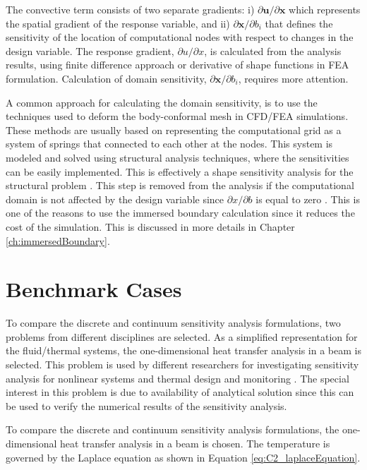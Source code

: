 The convective term consists of two separate gradients: i) $\partial \mathbf{u} / \partial \mathbf{x}$ which represents the spatial gradient of the response variable, and ii) $\partial \mathbf{x} / \partial b_i$ that defines the sensitivity of the location of computational nodes with respect to changes in the design variable. The response gradient, $\partial u/\partial x$, is calculated from the analysis results, using finite difference approach or derivative of shape functions in FEA formulation. Calculation of domain sensitivity, $\partial \mathbf{x} / \partial b_i$, requires more attention.

A common approach for calculating the domain sensitivity, is to use the techniques used to deform the body-conformal mesh in CFD/FEA simulations. These methods are usually based on representing the computational grid as a system of springs that connected to each other at the nodes. This system is modeled and solved using structural analysis techniques, where the sensitivities can be easily implemented. This is effectively a shape sensitivity analysis for the structural problem \cite{haftka1986structural}. This step is removed from the analysis if the computational domain is not affected by the design variable since $\partial x/\partial b$ is equal to zero \cite{gobal2014continuum}. This is one of the reasons to use the immersed boundary calculation since it reduces the cost of the simulation. This is discussed in more details in Chapter \ref{ch:immersedBoundary}.

\section{Benchmark Cases}
To compare the discrete and continuum sensitivity analysis formulations, two problems from different disciplines are selected. As a simplified representation for the fluid/thermal systems, the one-dimensional heat transfer analysis in a beam is selected. This problem is used by different researchers for investigating sensitivity analysis for nonlinear systems \cite{dowding2001sensitivity} and thermal design and monitoring \cite{szopa2005second, sorli2004computational}. The special interest in this problem is due to availability of analytical solution since this can be used to verify the numerical results of the sensitivity analysis.

To compare the discrete and continuum sensitivity analysis formulations, the one-dimensional heat transfer analysis in a beam is chosen. The temperature is governed by the Laplace equation as shown in Equation \eqref{eq:C2_laplaceEquation}.

